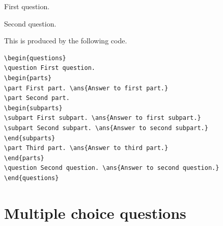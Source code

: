 \documentclass{article}
\begin{document}
\begin{questions}
\question First question.
\question Second question. 
\end{questions}

This is produced by the following code.
\begin{Verbatim}[frame=single]
\begin{questions}
\question First question.
\begin{parts}
\part First part. \ans{Answer to first part.}
\part Second part.
\begin{subparts}
\subpart First subpart. \ans{Answer to first subpart.}
\subpart Second subpart. \ans{Answer to second subpart.}
\end{subparts}
\part Third part. \ans{Answer to third part.}
\end{parts}
\question Second question. \ans{Answer to second question.}
\end{questions}
\end{Verbatim}


%
\section{Multiple choice questions}
\end{document}
